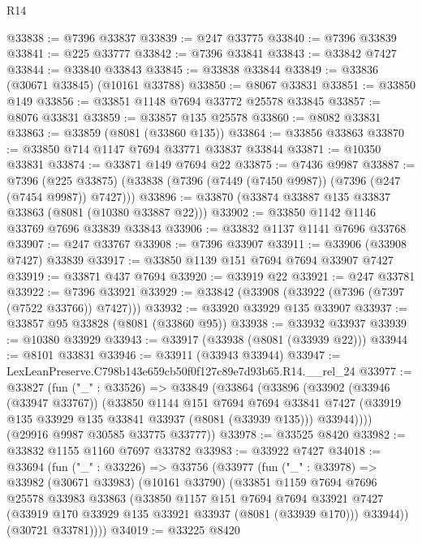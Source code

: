 \begin{lexlean}{R14}
\begin{coremodule}
@33838 := @7396 @33837
@33839 := @247 @33775
@33840 := @7396 @33839
@33841 := @225 @33777
@33842 := @7396 @33841
@33843 := @33842 @7427
@33844 := @33840 @33843
@33845 := @33838 @33844
@33849 := @33836 (@30671 @33845) (@10161 @33788)
@33850 := @8067 @33831
@33851 := @33850 @149
@33856 := @33851 @1148 @7694 @33772 @25578 @33845
@33857 := @8076 @33831
@33859 := @33857 @135 @25578
@33860 := @8082 @33831
@33863 := @33859 (@8081 (@33860 @135))
@33864 := @33856 @33863
@33870 := @33850 @714 @1147 @7694 @33771 @33837 @33844
@33871 := @10350 @33831
@33874 := @33871 @149 @7694 @22
@33875 := @7436 @9987
@33887 := @7396
    (@225 @33875)
    (@33838 (@7396 (@7449 (@7450 @9987)) (@7396 (@247 (@7454 @9987)) @7427)))
@33896 := @33870 (@33874 @33887 @135 @33837 @33863 (@8081 (@10380 @33887 @22)))
@33902 := @33850 @1142 @1146 @33769 @7696 @33839 @33843
@33906 := @33832 @1137 @1141 @7696 @33768
@33907 := @247 @33767
@33908 := @7396 @33907
@33911 := @33906 (@33908 @7427) @33839
@33917 := @33850 @1139 @151 @7694 @7694 @33907 @7427
@33919 := @33871 @437 @7694
@33920 := @33919 @22
@33921 := @247 @33781
@33922 := @7396 @33921
@33929 := @33842 (@33908 (@33922 (@7396 (@7397 (@7522 @33766)) @7427)))
@33932 := @33920 @33929 @135 @33907
@33937 := @33857 @95 @33828 (@8081 (@33860 @95))
@33938 := @33932 @33937
@33939 := @10380 @33929
@33943 := @33917 (@33938 (@8081 (@33939 @22)))
@33944 := @8101 @33831
@33946 := @33911 (@33943 @33944)
@33947 := LexLeanPreserve.C798b143e659cb50f0f127c89e7d93b65.R14.__rel_24
@33977 := @33827
    (fun ("_" : @33526) =>
    @33849
      (@33864
        (@33896
          (@33902
            (@33946 (@33947 @33767))
            (@33850
              @1144
              @151
              @7694
              @7694
              @33841
              @7427
              (@33919 @135 @33929 @135 @33841 @33937 (@8081 (@33939 @135)))
              @33944))))
      (@29916 @9987 @30585 @33775 @33777))
@33978 := @33525 @8420
@33982 := @33832 @1155 @1160 @7697 @33782
@33983 := @33922 @7427
@34018 := @33694
    (fun ("_" : @33226) =>
    @33756
      (@33977
        (fun ("_" : @33978) =>
        @33982
          (@30671 @33983)
          (@10161 @33790)
          (@33851
            @1159
            @7694
            @7696
            @25578
            @33983
            @33863
            (@33850
              @1157
              @151
              @7694
              @7694
              @33921
              @7427
              (@33919 @170 @33929 @135 @33921 @33937 (@8081 (@33939 @170)))
              @33944))
          (@30721 @33781))))
@34019 := @33225 @8420

\end{coremodule}
\end{lexlean}
